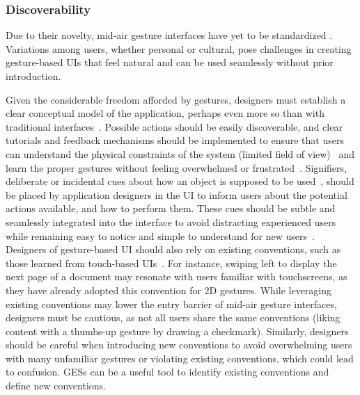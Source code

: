 \subsubsection{Discoverability} \label{sec:state_of_the_art:overview:challenges:discoverability}
Due to their novelty, mid-air gesture interfaces have yet to be standardized \cite{Norman:2010}. Variations among users, whether personal or cultural, pose challenges in creating gesture-based UIs that feel natural and can be used seamlessly without prior introduction.

Given the considerable freedom afforded by gestures, designers must establish a clear conceptual model of the application, perhaps even more so than with traditional interfaces~\cite{Norman:2010}.
%
Possible actions should be easily discoverable, and clear tutorials and feedback mechanisms should be implemented to ensure that users can understand the physical constraints of the system (\eg limited field of view)~\cite{Norman:1999} and learn the proper gestures without feeling overwhelmed or frustrated~\cite{Norman:2010}. 
%
Signifiers, \ie deliberate or incidental cues about how an object is supposed to be used~\cite{Norman:2008}, should be placed by application designers in the UI to inform users about the potential actions available, and how to perform them. These cues should be subtle and seamlessly integrated into the interface to avoid distracting experienced users while remaining easy to notice and simple to understand for new users~\cite{Rovelo:2015,Walter:2013}.
%
Designers of gesture-based UI should also rely on existing conventions, such as those learned from touch-based UIs~\cite{Norman:1999}. For instance, swiping left to display the next page of a document may resonate with users familiar with touchscreens, as they have already adopted this convention for 2D gestures. 
%
While leveraging existing conventions may lower the entry barrier of mid-air gesture interfaces, designers must be cautious, as not all users share the same conventions (\eg liking content with a thumbs-up gesture \vs by drawing a checkmark). 
Similarly, designers should be careful when introducing new conventions to avoid overwhelming users with many unfamiliar gestures or violating existing conventions, which could lead to confusion. 
GESs can be a useful tool to identify existing conventions and define new conventions.

